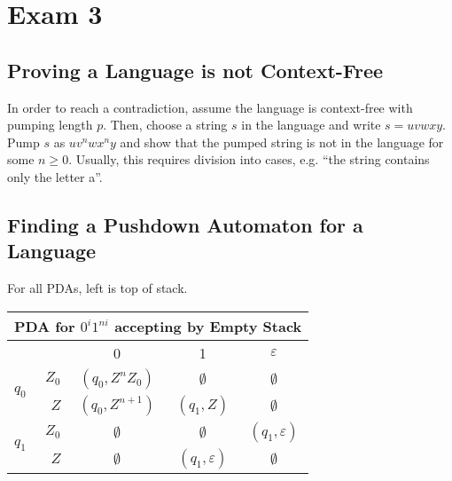 \section{Exam 3}\label{sec:exam-3-cheatsheet}

\subsection{Proving a Language is not Context-Free}
In order to reach a contradiction, assume the language is context-free with pumping length \(p\). Then, choose a string \(s\) in the language and write \(s=uvwxy\). Pump \(s\) as \(u v^n w x^n y\) and show that the pumped string is not in the language for some \(n\geq0\). Usually, this requires division into cases, e.g. ``the string contains only the letter a''.

\subsection{Finding a Pushdown Automaton for a Language}
For all PDAs, left is top of stack.

\begin{center}\begin{tabular}{l r c c c}
    \multicolumn{5}{c}{PDA for \(0^i 1^{ni}\) accepting by Empty Stack}\\\bottomrule
    & & 0 & 1 & \(\varepsilon \) \\\cmidrule{3-5}
    \multirow{2}{*}{\(q_0\)} & \(Z_0\) & \((q_0, Z^n Z_0)\) & \(\emptyset \) & \(\emptyset \) \\
    & \(Z\) & \((q_0, Z^{n+1})\)  & \((q_1, Z) \) & \(\emptyset \) \\\midrule
    \multirow{2}{*}{\(q_1\)} & \(Z_0\) & \(\emptyset \) & \(\emptyset \) & \((q_1, \varepsilon)\) \\
    & \(Z\) & \(\emptyset \) & \((q_1, \varepsilon)\) & \(\emptyset \) \\
\end{tabular}\end{center}

